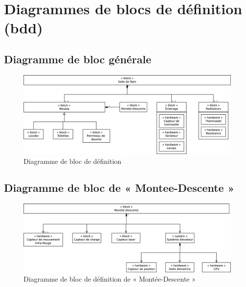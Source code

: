 \chapter{Diagrammes de blocs de définition (bdd)}
\section{Diagramme de bloc générale}
\begin{figure}
	\centering
	\includegraphics[width=1\linewidth]{diagrams/bathroom/diagramme_blocks_bdd.eps}
	\caption{Diagramme de bloc de définition}
	\label{fig:diagramme_bdd}
\end{figure}

\section{Diagramme de bloc de « Montee-Descente »}
\begin{figure}
	\centering
	\includegraphics[width=1\linewidth]{diagrams/bathroom/diagramme_blocks_bdd2.eps}
	\caption{Diagramme de bloc de définition de « Montée-Descente »}
	\label{fig:diagramme_bdd2}
\end{figure}

%
